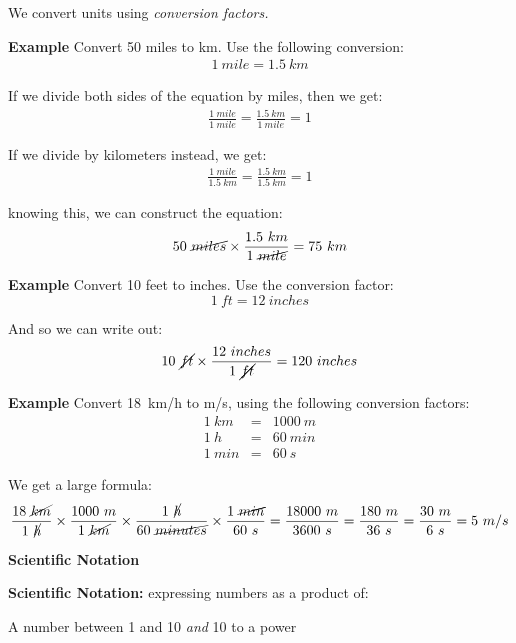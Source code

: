 \documentclass[12pt]{article}
\begin{document}
We convert units using \textit{conversion factors.}

\noindent\textbf{Example} Convert 50 miles to km. Use the following conversion:
\begin{eqnarray}
1~mile = 1.5~km
\end{eqnarray}

If we divide both sides of the equation by miles, then we get:
\begin{eqnarray}
\frac{1~mile}{1~mile} = \frac{1.5~km}{1~mile} = 1
\end{eqnarray}

If we divide by kilometers instead, we get:
\begin{eqnarray}
\frac{1~mile}{1.5~km} = \frac{1.5~km}{1.5~km} = 1
\end{eqnarray}

knowing this, we can construct the equation:
\begin{eqnarray}
50~\cancel{miles}\times\frac{1.5~km}{1~\cancel{mile}} = 75~km
\end{eqnarray}

\noindent\textbf{Example} Convert 10 feet to inches. Use the conversion factor:
\begin{equation}
1~ft = 12~inches
\end{equation}

And so we can write out:
\begin{eqnarray}
10~\cancel{ft}\times\frac{12~inches}{1~\cancel{ft}} = 120~inches
\end{eqnarray}


\noindent\textbf{Example} Convert 18~km/h to m/s, using the following conversion factors:
\begin{eqnarray}
1~km &=& 1000~m \\
1~h &=& 60~min \\
1~min &=& 60~s
\end{eqnarray}

We get a large formula:
\begin{eqnarray}
\frac{18~\cancel{km}}{1~\cancel{h}}\times\frac{1000~m}{1~\cancel{km}}\times\frac{1~\cancel{h}}{60~\cancel{minutes}}\times\frac{1~\cancel{min}}{60~s} = \frac{18000~m}{3600~s} = \frac{180~m}{36~s} = \frac{30~m}{6~s} = 5~m/s
\end{eqnarray}

\noindent\textbf{\large Scientific Notation}

\textbf{Scientific Notation:} expressing numbers as a product of:

\begin{center}
A number between 1 and 10 \textit{and} 10 to a power
\end{center}
\end{document}
